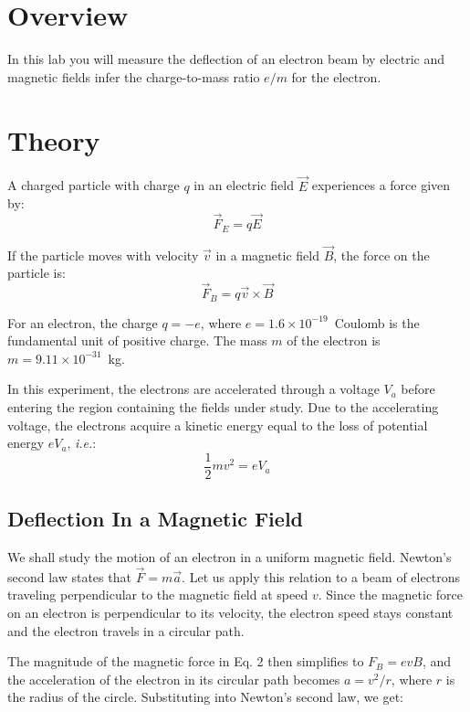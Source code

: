 \section{Overview}

In this lab you will measure the deflection of an electron beam by electric and
magnetic fields infer the charge-to-mass ratio $e/m$ for the electron.

\section{Theory}

A charged particle with charge $q$ in an electric field $\vec{E}$
experiences a force given by:
\begin{equation}
\vec{F}_E = q \vec{E}
\end{equation}

\noindent If the particle moves with velocity $\vec{v}$ in a magnetic field
$\vec{B}$, the force on the particle is:
\begin{equation}
\label{lorentz}
\vec{F}_B = q \vec{v} \times \vec{B}
\end{equation}

For an electron, the charge $q = -e$, where $e = 1.6 \times 10^{-19}$~Coulomb is
the fundamental unit of positive charge. The mass $m$ of the electron is $m =
9.11 \times 10^{-31}$~kg.

In this experiment, the electrons are accelerated through a voltage
$V_a$ before entering the region containing the fields
under study. Due to the accelerating voltage, the electrons acquire a
kinetic energy equal to the loss of potential energy $eV_a$, {\em i.e.}:
\begin{equation}
\label{energy}
\frac{1}{2} mv^{2} = eV_a
\end{equation}

\subsection{Deflection In a Magnetic Field}

We shall study the motion of an electron in a uniform magnetic field.  Newton's
second law states that $\vec{F} = m\vec{a}$. Let us apply this relation to a
beam of electrons traveling perpendicular to the magnetic field at speed
$v$. Since the magnetic force on an electron is perpendicular to its velocity,
the electron speed stays constant and the electron travels in a circular path.

The magnitude of the magnetic force in Eq. 2 then simplifies to
$F_{B }= evB$, and the acceleration of the electron in its
circular path becomes $a = v^{2}/r$, where $r$ is the radius
of the circle. Substituting into Newton's second law,
we get:


